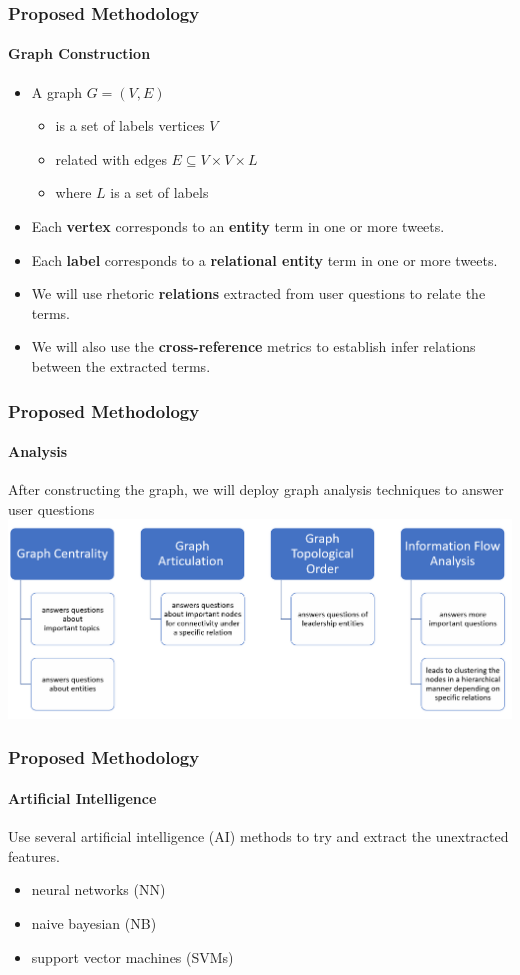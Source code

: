 \documentclass[xcolor=table]{beamer}
\begin{document}
\begin{frame}
\frametitle{Proposed Methodology}
\framesubtitle{Graph Construction}
\begin{itemize}
\item A graph  $G=(V,E)$ 
\begin{itemize}
    \item is a set of labels vertices $V$
    \item related with edges $E\subseteq V\times V\times L$
    \item where $L$ is a set of labels
\end{itemize}

\item Each \textbf{vertex} corresponds to an \textbf{entity} term in one or more tweets. 
\item Each \textbf{label} corresponds to a \textbf{relational entity} term in one or more tweets.
\item We will use rhetoric \textbf{relations} extracted from user questions to relate the terms. 
\item We will also use the \textbf{cross-reference} metrics to establish infer relations between the extracted terms. 
\end{itemize}

\end{frame}


\begin{frame}
\frametitle{Proposed Methodology}
\framesubtitle{Analysis}
After constructing the graph, we will deploy graph analysis techniques to answer user questions
\includegraphics[scale=0.35]{Picture6.png}

\end{frame}

\begin{frame}
\frametitle{Proposed Methodology}
\framesubtitle{Artificial Intelligence}
Use several artificial intelligence (AI) methods to try and extract the unextracted features.

\begin{itemize}
    \item neural networks (NN)
    \item naive bayesian (NB)
    \item support vector machines (SVMs)
\end{itemize}
\end{frame}
\end{document}
